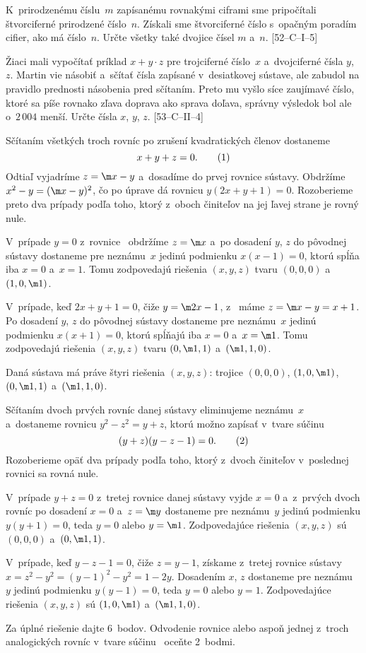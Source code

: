 {
\D%
K~prirodzenému číslu~$m$ zapísanému rovnakými ciframi sme pripočítali štvorciferné
prirodzené číslo~$n$. Získali sme štvorciferné číslo s~opačným poradím cifier,
ako má číslo~$n$. Určte všetky také dvojice čísel $m$ a~$n$. [52--C--I--5]

Žiaci mali vypočítať príklad $x+y\cdot z$ pre trojciferné číslo~$x$
a~dvojciferné čísla $y$, $z$. Martin vie násobiť a~sčítať čísla zapísané
v~desiatkovej sústave, ale zabudol na pravidlo prednosti násobenia pred sčítaním.
Preto mu vyšlo síce zaujímavé číslo, ktoré sa píše rovnako zľava doprava ako sprava doľava,
správny výsledok bol ale o~$2\,004$ menší. Určte čísla $x$, $y$, $z$. [53--C--II--4]
}

{%
Sčítaním všetkých troch rovníc po zrušení kvadratických členov
dostaneme
$$
x+y+z=0.               \tag1
$$
Odtiaľ vyjadríme $z=\m x-y$ a~dosadíme do prvej rovnice sústavy.
Obdržíme
$x^2-y=(\m x-y)^2$, čo po úprave dá rovnicu $y(2x+y+1)=0$.
Rozoberieme preto dva prípady podľa toho, ktorý
z~oboch činiteľov na jej ľavej strane je rovný nule.

V~prípade $y=0$ z~rovnice~ obdržíme $z={\m x}$ a~po dosadení
$y$, $z$ do pôvodnej sústavy dostaneme pre neznámu~$x$
jedinú podmienku $x(x-1)=0$, ktorú spĺňa iba $x=0$
a~$x=1$. Tomu zodpovedajú riešenia $(x,y,z)$ tvaru $(0,0,0)$
a~$(1,0,\m1)$.

V~prípade, keď $2x+y+1=0$, čiže $y=\m2x-1$, z~ máme
$z=\m x-y={x+1}$. Po dosadení $y$, $z$ do pôvodnej sústavy
dostaneme pre neznámu~$x$ jedinú podmienku $x({x+1})=0$,
ktorú spĺňajú iba $x=0$ a~$x=\m1$. Tomu zodpovedajú riešenia
$(x,y,z)$ tvaru $(0,\m1,1)$ a~$(\m1,1,0)$.

\zaver
Daná sústava má práve štyri riešenia $(x,y,z)$: trojice
$(0,0,0)$, $(1,0,\m1)$, $(0,\m1,1)$ a~$(\m1,1,0)$.

\ineriesenie
Sčítaním dvoch prvých rovníc danej sústavy eliminujeme neznámu~$x$
a~dostaneme rovnicu $y^2-z^2=y+z$, ktorú možno zapísať
v~tvare súčinu
$$
(y+z)(y-z-1)=0.            \tag2
$$
Rozoberieme opäť dva prípady podľa toho, ktorý z~dvoch činiteľov v~poslednej rovnici sa
rovná nule.

V~prípade $y+z=0$ z~tretej rovnice danej sústavy vyjde $x=0$
a~z~prvých dvoch rovníc po dosadení $x=0$ a~$z=\m y$ dostaneme pre
neznámu~$y$ jedinú podmienku $y(y+1)=0$, teda $y=0$ alebo
$y=\m1$. Zodpovedajúce riešenia $(x,y,z)$ sú $(0,0,0)$
a~$(0,\m1,1)$.

V~prípade, keď $y-z-1=0$, čiže $z=y-1$, získame
z~tretej rovnice sústavy
$x=z^2-y^2=(y-1)^2-y^2=1-2y$. Dosadením $x$, $z$ dostaneme pre
neznámu~$y$ jedinú podmienku $y(y-1)=0$, teda $y=0$ alebo
$y=1$. Zodpovedajúce riešenia $(x,y,z)$ sú $(1,0,\m1)$
a~$(\m1,1,0)$.


\nobreak\medskip\petit\noindent
Za úplné riešenie dajte 6~bodov. Odvodenie rovnice
 alebo aspoň jednej z~troch analogických rovníc
v~tvare súčinu~ oceňte 2~bodmi.
\endpetit
\bigbreak}

